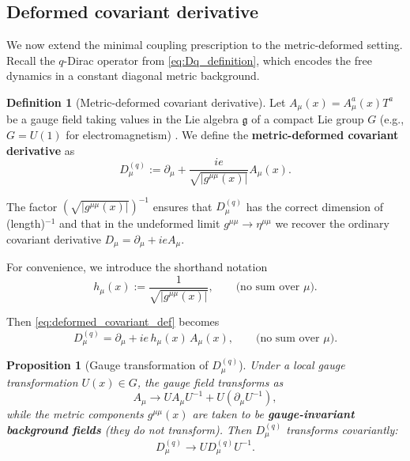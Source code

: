 \documentclass[12pt,a4paper]{article}
\theoremstyle{plain}
\newtheorem{proposition}[theorem]{Proposition}
\theoremstyle{definition}
\newtheorem{definition}[theorem]{Definition}
\begin{document}
\subsection{Deformed covariant derivative}

We now extend the minimal coupling prescription to the metric-deformed setting. Recall the $q$-Dirac operator from \eqref{eq:Dq_definition}, which encodes the free dynamics in a constant diagonal metric background.

\begin{definition}[Metric-deformed covariant derivative]
\label{def:deformed_covariant}
Let \(A_\mu(x) = A_\mu^a(x) T^a\) be a gauge field taking values in the Lie algebra \(\mathfrak{g}\) of a compact Lie group \(G\) (e.g., \(G = U(1)\) for electromagnetism) \cite{Cacic2023, Schwartz2013}. We define the \textbf{metric-deformed covariant derivative} as
\begin{equation}\label{eq:deformed_covariant_def}
D_\mu^{(q)} := \partial_\mu + \frac{ie}{\sqrt{|g^{\mu\mu}(x)|}} A_\mu(x).
\end{equation}

The factor \((\sqrt{|g^{\mu\mu}(x)|})^{-1}\) ensures that \(D_\mu^{(q)}\) has the correct dimension of (length)\(^{-1}\) and that in the undeformed limit \(g^{\mu\mu} \to \eta^{\mu\mu}\) we recover the ordinary covariant derivative \(D_\mu = \partial_\mu + ieA_\mu\).
\end{definition}

For convenience, we introduce the shorthand notation
\begin{equation}\label{eq:h_mu_def}
h_\mu(x) := \frac{1}{\sqrt{|g^{\mu\mu}(x)|}}, \qquad \text{(no sum over }\mu\text{)}.
\end{equation}

Then \eqref{eq:deformed_covariant_def} becomes
\begin{equation}
D_\mu^{(q)} = \partial_\mu + ie\, h_\mu(x)\, A_\mu(x), \qquad \text{(no sum over }\mu\text{)}. \label{eq:deformed_covariant_h}
\end{equation}

\begin{proposition}[Gauge transformation of \(D_\mu^{(q)}\)]
\label{prop:gauge_transform}
Under a local gauge transformation \(U(x) \in G\), the gauge field transforms as
\begin{equation}
A_\mu \to U A_\mu U^{-1} + U (\partial_\mu U^{-1}), \label{eq:gauge_transform_A}
\end{equation}
while the metric components \(g^{\mu\mu}(x)\) are taken to be \textbf{gauge-invariant background fields} (they do not transform). Then \(D_\mu^{(q)}\) transforms covariantly:
\begin{equation}
D_\mu^{(q)} \to U D_\mu^{(q)} U^{-1}. \label{eq:covariant_transform_def}
\end{equation}
\end{proposition}
\end{document}
